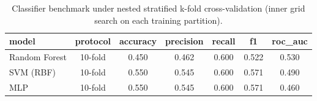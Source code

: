 \begin{table}[!t]
\centering
\caption{Classifier benchmark under nested stratified k-fold cross-validation (inner grid search on each training partition).}
\label{tab:kfold}
\begin{tabular}{lcccccc}
\hline
\textbf{model} & \textbf{protocol} & \textbf{accuracy} & \textbf{precision} & \textbf{recall} & \textbf{f1} & \textbf{roc\_auc} \\
\hline
Random Forest & 10-fold & 0.450 & 0.462 & 0.600 & 0.522 & 0.530 \\
SVM (RBF) & 10-fold & 0.550 & 0.545 & 0.600 & 0.571 & 0.490 \\
MLP & 10-fold & 0.550 & 0.545 & 0.600 & 0.571 & 0.460 \\
\hline
\end{tabular}
\end{table}
